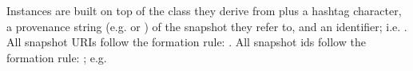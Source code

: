 																																																																																																																																																																																																																																																																																																																																																																																																															Instances are built on top of the class they derive from plus a hashtag character,
																																																																																																																																																																																																																																																																																																																																																																																																															a provenance string (e.g.  or
																																																																																																																																																																																																																																																																																																																																																																																																															) of the snapshot they refer to, and an identifier;
																																																																																																																																																																																																																																																																																																																																																																																																															i.e. .
																																																																																																																																																																																																																																																																																																																																																																																																															All snapshot URIs follow the formation rule: .
																																																																																																																																																																																																																																																																																																																																																																																																															All snapshot ids follow the formation rule: ; e.g.
